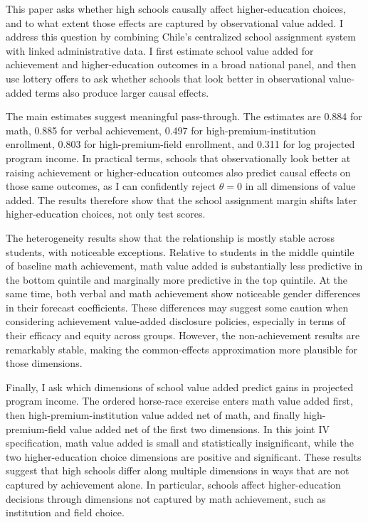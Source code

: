 \documentclass[a4paper, article, english, oneside, unknownkeysallowed, 12pt]{memoir}
\begin{document}
This paper asks whether high schools causally affect higher-education choices, and to what extent those effects are captured by observational value added.
I address this question by combining Chile's centralized school assignment system with linked administrative data.
I first estimate school value added for achievement and higher-education outcomes in a broad national panel, and then use lottery offers to ask whether schools that look better in observational value-added terms also produce larger causal effects.

The main estimates suggest meaningful pass-through.
The estimates are 0.884 for math, 0.885 for verbal achievement, 0.497 for high-premium-institution enrollment, 0.803 for high-premium-field enrollment, and 0.311 for log projected program income.
In practical terms, schools that observationally look better at raising achievement or higher-education outcomes also predict causal effects on those same outcomes, as I can confidently reject $\theta = 0$ in all dimensions of value added.
The results therefore show that the school assignment margin shifts later higher-education choices, not only test scores.

The heterogeneity results show that the relationship is mostly stable across students, with noticeable exceptions.
Relative to students in the middle quintile of baseline math achievement, math value added is substantially less predictive in the bottom quintile and marginally more predictive in the top quintile.
At the same time, both verbal and math achievement show noticeable gender differences in their forecast coefficients.
These differences may suggest some caution when considering achievement value-added disclosure policies, especially in terms of their efficacy and equity across groups.
However, the non-achievement results are remarkably stable, making the common-effects approximation more plausible for those dimensions.


Finally, I ask which dimensions of school value added predict gains in projected program income.
The ordered horse-race exercise enters math value added first, then high-premium-institution value added net of math, and finally high-premium-field value added net of the first two dimensions.
In this joint IV specification, math value added is small and statistically insignificant, while the two higher-education choice dimensions are positive and significant.
These results suggest that high schools differ along multiple dimensions in ways that are not captured by achievement alone.
In particular, schools affect higher-education decisions through dimensions not captured by math achievement, such as institution and field choice.
\end{document}
